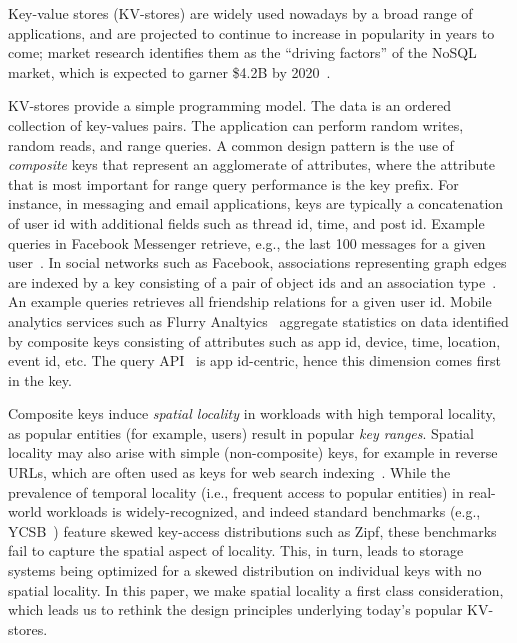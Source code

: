 Key-value stores (KV-stores) are widely used nowadays by a broad range of applications, and are projected
to continue to increase in popularity in years to come; market research  identifies them as the 
``driving factors'' of the NoSQL market, which is expected to garner \$4.2B by 2020~\cite{alliedmarketresearch}.

KV-stores provide a simple programming model. 
The data is an ordered collection of key-values pairs. The application can perform random writes, 
random reads, and range queries. A common design pattern is the use of \emph{composite} 
keys that represent an agglomerate of attributes, where the attribute that is most important for range query
performance is the key prefix. 
For instance,  in messaging and email applications, keys are typically a concatenation of user id with additional fields 
such as thread id, time, and post id. Example queries in Facebook Messenger retrieve, e.g., the last 100 messages for a 
given user~\cite{Borthakur:2011:AHG:1989323.1989438}. %
In social networks such as Facebook, associations representing graph edges are indexed by a key consisting of a 
pair of object ids and an association type~\cite{Armstrong:2013:LDB:2463676.2465296}.
An example queries retrieves all friendship relations for a given user id.  
Mobile analytics services such as Flurry Analtyics~\cite{flurry} aggregate statistics 
on data identified by composite keys consisting of attributes such as app id, device, time, location, 
event id, etc. The query API~\cite{flurry-api} is app id-centric, hence this dimension comes first 
in the key.

Composite keys induce \emph{spatial locality} in workloads with high {temporal locality}, as 
popular entities (for example, users) result in popular \emph{key ranges}. 
Spatial locality may also arise with simple (non-composite) keys, for example in 
 reverse  URLs, which  are often used as keys for web search indexing~\cite{Cho:1998:ECT:297805.297835}. 
While the prevalence of temporal locality (i.e., frequent access to popular entities) in real-world workloads is widely-recognized, 
and indeed standard benchmarks (e.g., YCSB~\cite{YCSB})  feature skewed key-access distributions such as Zipf, 
these benchmarks fail to capture the spatial aspect of locality.
This, in turn, leads to storage systems being optimized for a skewed distribution on individual keys with no spatial locality.
In this paper, we make spatial locality a first class  consideration, which 
leads us to rethink the design principles underlying today's popular KV-stores.

